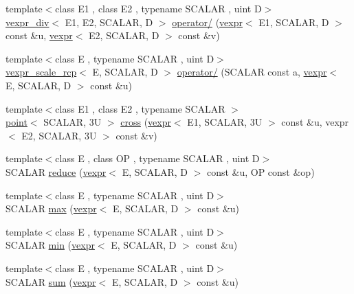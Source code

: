 \begin{DoxyCompactItemize}
\item 
{\footnotesize template$<$class E1 , class E2 , typename S\+C\+A\+L\+AR , uint D$>$ }\\\hyperlink{structmui_1_1vexpr__div}{vexpr\+\_\+div}$<$ E1, E2, S\+C\+A\+L\+AR, D $>$ \hyperlink{namespacemui_a5e62c5e5c1e0d4d7e34e4a0fe8aa1c9b}{operator/} (\hyperlink{structmui_1_1vexpr}{vexpr}$<$ E1, S\+C\+A\+L\+AR, D $>$ const \&u, \hyperlink{structmui_1_1vexpr}{vexpr}$<$ E2, S\+C\+A\+L\+AR, D $>$ const \&v)
\item 
{\footnotesize template$<$class E , typename S\+C\+A\+L\+AR , uint D$>$ }\\\hyperlink{structmui_1_1vexpr__scale__rcp}{vexpr\+\_\+scale\+\_\+rcp}$<$ E, S\+C\+A\+L\+AR, D $>$ \hyperlink{namespacemui_a33a2fcf411db9de5bafee840e1f6c899}{operator/} (S\+C\+A\+L\+AR const a, \hyperlink{structmui_1_1vexpr}{vexpr}$<$ E, S\+C\+A\+L\+AR, D $>$ const \&u)
\item 
{\footnotesize template$<$class E1 , class E2 , typename S\+C\+A\+L\+AR $>$ }\\\hyperlink{structmui_1_1point}{point}$<$ S\+C\+A\+L\+AR, 3\+U $>$ \hyperlink{namespacemui_a664a9f3cb822813be2e0bb609f1ba082}{cross} (\hyperlink{structmui_1_1vexpr}{vexpr}$<$ E1, S\+C\+A\+L\+AR, 3\+U $>$ const \&u, vexpr$<$ E2, S\+C\+A\+L\+A\+R, 3\+U $>$ const \&v)
\item 
{\footnotesize template$<$class E , class OP , typename S\+C\+A\+L\+AR , uint D$>$ }\\S\+C\+A\+L\+AR \hyperlink{namespacemui_a8b05a2a7a7f150030d6dfc7a1708892f}{reduce} (\hyperlink{structmui_1_1vexpr}{vexpr}$<$ E, S\+C\+A\+L\+AR, D $>$ const \&u, OP const \&op)
\item 
{\footnotesize template$<$class E , typename S\+C\+A\+L\+AR , uint D$>$ }\\S\+C\+A\+L\+AR \hyperlink{namespacemui_aca8bb75431ac5c48173731e02a5c6246}{max} (\hyperlink{structmui_1_1vexpr}{vexpr}$<$ E, S\+C\+A\+L\+AR, D $>$ const \&u)
\item 
{\footnotesize template$<$class E , typename S\+C\+A\+L\+AR , uint D$>$ }\\S\+C\+A\+L\+AR \hyperlink{namespacemui_afabb57f76b23f5a3542a0510943e69e0}{min} (\hyperlink{structmui_1_1vexpr}{vexpr}$<$ E, S\+C\+A\+L\+AR, D $>$ const \&u)
\item 
{\footnotesize template$<$class E , typename S\+C\+A\+L\+AR , uint D$>$ }\\S\+C\+A\+L\+AR \hyperlink{namespacemui_a9f13cbef4dfda0f7d16631cd7c87bef2}{sum} (\hyperlink{structmui_1_1vexpr}{vexpr}$<$ E, S\+C\+A\+L\+AR, D $>$ const \&u)

\end{DoxyCompactItemize}
